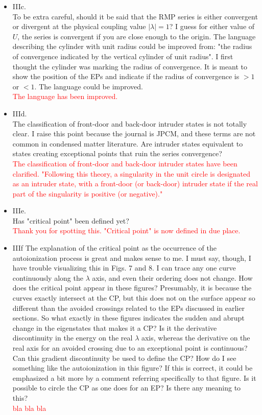 \documentclass[10pt]{letter}
\newcommand{\alert}[1]{\textcolor{red}{#1}}
\begin{document}
\begin{letter}
\begin{itemize}
\item 
	{IIIc.\\
	To be extra careful, should it be said that the RMP series is either convergent or divergent at the physical coupling value $|\lambda|=1$? 
	I guess for either value of $U$, the series is convergent if you are close enough to the origin.
	The language describing the cylinder with unit radius could be improved from: "the radius of convergence indicated by the vertical cylinder of unit radius".
	I first thought the cylinder was marking the radius of convergence. It is meant to show the position of the EPs and indicate if the radius of convergence is $>1$ or $<1$. 
	The language could be improved.}
	\\
	\alert{The language has been improved.}

\item 
	{IIId.\\
	The classification of front-door and back-door intruder states is not totally clear. 
	I raise this point because the journal is JPCM, and these terms are not common in condensed matter literature. 
	Are intruder states equivalent to states creating exceptional points that ruin the series convergence?}
	\\
	\alert{The classification of front-door and back-door intruder states have been clarified.
	"Following this theory, a singularity in the unit circle is designated as an intruder state, with a front-door (or back-door) intruder state if the real part of the singularity is positive (or negative)."}

\item 
	{IIIe.\\
	Has "critical point" been defined yet?}
	\\
	\alert{Thank you for spotting this. 
	"Critical point" is now defined in due place.}

\item 
	{IIIf
	The explanation of the critical point as the occurrence of the autoionization process is great and makes sense to me. 
	I must say, though, I have trouble visualizing this in Figs. 7 and 8. 
	I can trace any one curve continuously along the $\lambda$ axis, and even their ordering does not change. 
	How does the critical point appear in these figures? 
	Presumably, it is because the curves exactly intersect at the CP, but this does not on the surface appear so different than the avoided crossings related to the EPs discussed in earlier sections.
	So what exactly in these figures indicates the sudden and abrupt change in the eigenstates that makes it a CP? 
	Is it the derivative discontinuity in the energy on the real $\lambda$ axis, whereas the derivative on the real axis for an avoided crossing due to an exceptional point is continuous? 
	Can this gradient discontinuity be used to define the CP? 
	How do I see something like the autoionization in this figure? 
	If this is correct, it could be emphasized a bit more by a comment referring specifically to that figure.
	Is it possible to circle the CP as one does for an EP? 
	Is there any meaning to this?}
	\\
	\alert{bla bla bla}


\end{itemize}
\end{letter}
\end{document}

